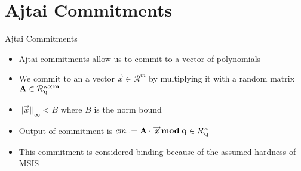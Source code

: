 \section{Ajtai Commitments}
\begin{frame}{Ajtai Commitments}
    \begin{itemize}
        \item Ajtai commitments allow us to commit to a vector of polynomials
        \item We commit to an a vector $\overrightarrow{x}  \in \mathcal{R}^{m}$ by multiplying it with a random matrix $\bf{A} \in \mathcal{R}^{\kappa \times m}_\mathrm{ q}$
        \item $||\overrightarrow{x}||_{\infty} < B$ where $B$ is the norm bound
        \item Output of commitment is  $cm := \bf{A} \cdot \overrightarrow{x} mod \; q \in \mathcal{R}^{\kappa}_q$
        \item This commitment is considered binding because of the assumed hardness of MSIS
    \end{itemize}
\end{frame}